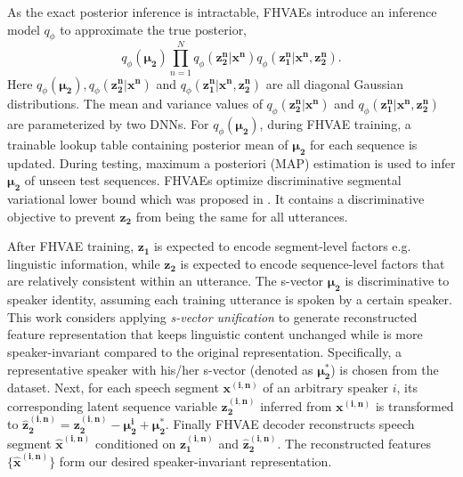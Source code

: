 \documentclass[a4paper]{article}
\begin{document}
As the exact posterior inference is intractable,  FHVAEs introduce an inference model $q_{\phi}$
to approximate the true posterior,
\begin{equation}
   q_{\phi} (\bm{\mu_2})\prod_{n=1}^{N}q_{\phi} (\bm{z_2^n}| \bm{x^n}) q_{\phi}(\bm{z_1^n}|\bm{x^n}, \bm{z_2^n}).
   \label{eqt:inference}
\end{equation}
Here  $q_{\phi} (\bm{\mu_2}), q_{\phi} (\bm{z_2^n}| \bm{x^n})$ and $q_{\phi}(\bm{z_1^n}|\bm{x^n}, \bm{z_2^n})$ are all diagonal Gaussian distributions. The mean and variance values of $q_{\phi} (\bm{z_2^n}| \bm{x^n})$ and $q_{\phi}(\bm{z_1^n}|\bm{x^n}, \bm{z_2^n})$ are parameterized by two DNNs. For $q_{\phi} (\bm{\mu_2})$, during FHVAE training, a trainable lookup table containing posterior mean of $\bm{\mu_2}$ for each sequence is updated. During testing, maximum a posteriori (MAP) estimation is used to infer  $\bm{\mu_2}$ of unseen test sequences.
FHVAEs optimize discriminative segmental variational lower bound which was proposed in \cite{hsu2017nips}. It contains a  discriminative objective to 
prevent $\bm{z_2}$ from being the same for all utterances.

After FHVAE training, $\bm{z_1}$ is expected to encode segment-level factors e.g. linguistic information, while $\bm{z_2}$ is expected to encode sequence-level factors that are relatively consistent within an utterance. The s-vector $\bm{\mu_2}$ is  discriminative to speaker identity, assuming each training utterance is spoken by a certain speaker. This work considers applying \textit{s-vector unification} \cite{Feng2019improving} to generate reconstructed feature representation that keeps linguistic content unchanged while is more speaker-invariant compared to the original representation.
Specifically, a representative speaker with his/her s-vector (denoted as $\bm{\mu_2^*}$) is chosen from the dataset. Next, for each speech segment $\bm{x^{(i,n)}}$ of an arbitrary speaker $i$, its corresponding latent sequence variable $\bm{z_2^{(i,n)}}$ inferred from $\bm{x^{(i,n)}}$ is transformed to $\bm{\hat{z}_2^{(i,n)}}=\bm{z_2^{(i,n)}}-\bm{\mu_2^i}+\bm{\mu_2^*}$. 
Finally  FHVAE decoder reconstructs speech segment $\bm{\hat{x}^{(i,n)}}$ conditioned on $\bm{z_1^{(i,n)}}$ and $ \bm{\hat{z}_2^{(i,n)}}$. The reconstructed features $\{\bm{\hat{x}^{(i,n)}}\}$ form our desired speaker-invariant representation.
\end{document}
